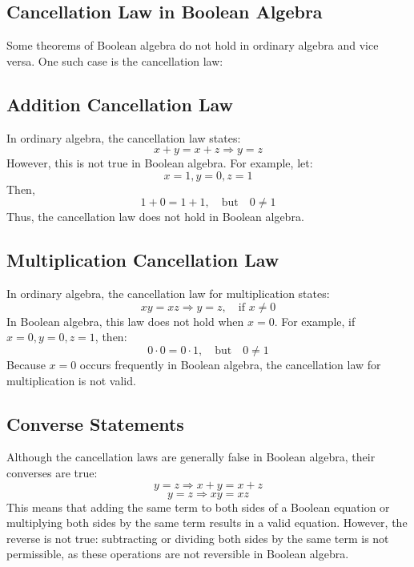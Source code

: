 \subsection{Cancellation Law in Boolean Algebra}

Some theorems of Boolean algebra do not hold in ordinary algebra and vice versa. One such case is the cancellation law:

\subsection{Addition Cancellation Law}
In ordinary algebra, the cancellation law states:
\[
    x + y = x + z \Rightarrow y = z
\]
However, this is not true in Boolean algebra. For example, let:
\[ x = 1, y = 0, z = 1 \]
Then,
\[
    1 + 0 = 1 + 1, \quad \text{but} \quad 0 \neq 1
\]
Thus, the cancellation law does not hold in Boolean algebra.

\subsection{Multiplication Cancellation Law}
In ordinary algebra, the cancellation law for multiplication states:
\[
    xy = xz \Rightarrow y = z, \quad \text{if } x \neq 0
\]
In Boolean algebra, this law does not hold when \( x = 0 \). For example, if \( x = 0, y = 0, z = 1 \), then:
\[
    0 \cdot 0 = 0 \cdot 1, \quad \text{but} \quad 0 \neq 1
\]
Because \( x = 0 \) occurs frequently in Boolean algebra, the cancellation law for multiplication is not valid.

\subsection{Converse Statements}
Although the cancellation laws are generally false in Boolean algebra, their converses are true:
\[
    y = z \Rightarrow x + y = x + z
\]
\[
    y = z \Rightarrow xy = xz
\]
This means that adding the same term to both sides of a Boolean equation or multiplying both sides by the same term results in a valid equation. However, the reverse is not true: subtracting or dividing both sides by the same term is not permissible, as these operations are not reversible in Boolean algebra.
